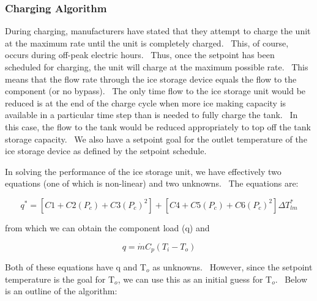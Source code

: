 \subsubsection{Charging Algorithm}\label{charging-algorithm}

During charging, manufacturers have stated that they attempt to charge the unit at the maximum rate until the unit is completely charged.~ This, of course, occurs during off-peak electric hours.~ Thus, once the setpoint has been scheduled for charging, the unit will charge at the maximum possible rate.~ This means that the flow rate through the ice storage device equals the flow to the component (or no bypass).~ The only time flow to the ice storage unit would be reduced is at the end of the charge cycle when more ice making capacity is available in a particular time step than is needed to fully charge the tank.~ In this case, the flow to the tank would be reduced appropriately to top off the tank storage capacity. ~We also have a setpoint goal for the outlet temperature of the ice storage device as defined by the setpoint schedule.

In solving the performance of the ice storage unit, we have effectively two equations (one of which is non-linear) and two unknowns.~ The equations are:

\begin{equation}
{q^*} = \left[ {C1 + C2\left( {{P_c}} \right) + C3{{\left( {{P_c}} \right)}^2}} \right] + \left[ {C4 + C5\left( {{P_c}} \right) + C6{{\left( {{P_c}} \right)}^2}} \right]\Delta T_{lm}^*
\end{equation}

from which we can obtain the component load (q) and

\begin{equation}
q = \dot m{C_p}\left( {{T_i} - {T_o}} \right)
\end{equation}

Both of these equations have q and T\(_{o}\) as unknowns.~ However, since the setpoint temperature is the goal for T\(_{o}\), we can use this as an initial guess for T\(_{o}\).~ Below is an outline of the algorithm:

